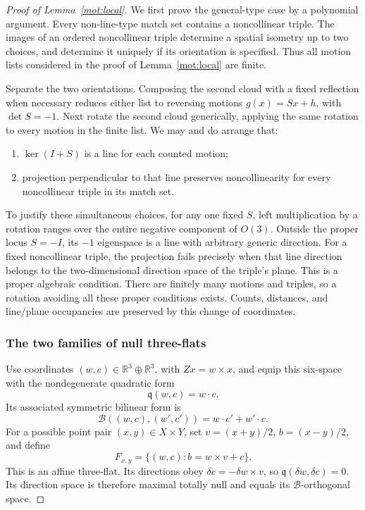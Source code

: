 \begin{proof}[Proof of Lemma~\ref{mot:local}]
We first prove the general-type case by a polynomial argument.
Every non-line-type match set contains a noncollinear triple.
The images of an ordered noncollinear triple determine a spatial
isometry up to two choices, and determine it uniquely if its
orientation is specified.  Thus all motion lists considered in
the proof of Lemma~\ref{mot:local} are finite.

Separate the two orientations.  Composing the second cloud with a
fixed reflection when necessary reduces either list to reversing
motions \(g(x)=Sx+h\), with \(\det S=-1\).  Next rotate the
second cloud generically, applying the same rotation to every
motion in the finite list.  We may and do arrange that:
\begin{enumerate}
\item \(\ker(I+S)\) is a line for each counted motion;
\item projection perpendicular to that line preserves
noncollinearity for every noncollinear triple in its match set.
\end{enumerate}
To justify these simultaneous choices, for any one fixed \(S\),
left multiplication by a rotation ranges over the entire negative
component of \(O(3)\).  Outside the proper locus \(S=-I\), its
\(-1\) eigenspace is a line with arbitrary generic direction.
For a fixed noncollinear triple, the projection fails precisely
when that line direction belongs to the two-dimensional direction
space of the triple's plane.  This is a proper algebraic condition.
There are finitely many motions and triples, so a rotation avoiding
all these proper conditions exists.  Counts, distances, and
line/plane occupancies are preserved by this change of coordinates.

\subsubsection{The two families of null three-flats}

Use coordinates \((w,c)\in\mathbb R^3\oplus\mathbb R^3\), with
\(Zx=w\times x\), and equip this six-space with the nondegenerate
quadratic form
\[
 \mathfrak q(w,c)=w\cdot c.
\]
Its associated symmetric bilinear form is
\[
 \mathcal B((w,c),(w',c'))=w\cdot c'+w'\cdot c.
\]
For a possible point pair \((x,y)\in X\times Y\), set
\(v=(x+y)/2\), \(b=(x-y)/2\), and define
\begin{equation}
\label{mot:pair-flat}
 F_{x,y}=\{(w,c):b=w\times v+c\}.
\end{equation}
This is an affine three-flat.  Its directions obey
\(\delta c=-\delta w\times v\), so
\(\mathfrak q(\delta w,\delta c)=0\).  Its direction space is
therefore maximal totally null and equals its
\(\mathcal B\)-orthogonal space.


\end{proof}
